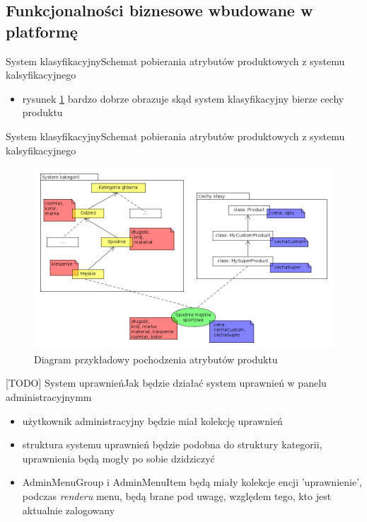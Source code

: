 \documentclass[polish,xcolor=table,9pt,aspectratio=1610,hyperref={pdfpagemode=FullScreen}]{beamer}
\begin{document}
\subsection{Funkcjonalności biznesowe wbudowane w platformę}

\begin{frame}{System klasyfikacyjny}{Schemat pobierania atrybutów produktowych z systemu kalsyfikacyjnego}
\begin{itemize}
	\begin{definition}{Systemu klasyfikacyjny}
		Jest to drzewiasta struktura kategorii połączona z encjami, które mogą przyjmować postać różnych cech produktu, definiować wartości tych cech łączyć je z produktem. Cechy są dzidziczne, zgodnie z ułożeniem drzewa kategorii.
	\end{definition}
	\item<1-> rysunek \ref{cechyProd} bardzo dobrze obrazuje skąd system klasyfikacyjny bierze cechy produktu
\end{itemize}
\end{frame}

\begin{frame}{System klasyfikacyjny}{Schemat pobierania atrybutów produktowych z systemu kalsyfikacyjnego}
	\begin{figure}
		\begin{center}
			\includegraphics[scale=0.3]{cechyProd.png}
		\end{center}
		\caption{{\color{black}Diagram przykładowy pochodzenia atrybutów produktu}} \label{cechyProd}
	\end{figure}
\end{frame}

\begin{frame}{[TODO] System uprawnień}{Jak będzie działać system uprawnień w panelu administracyjnymm}
\begin{itemize}
	\item<1-> użytkownik administracyjny będzie miał kolekcję uprawnień
	\item<2-> struktura systemu uprawnień będzie podobna do struktury kategorii, uprawnienia będą mogły po sobie dzidziczyć
	\item<3-> AdminMenuGroup i AdminMenuItem będą miały kolekcje encji 'uprawnienie', podczas \textit{renderu} menu, będą brane pod uwagę, względem tego, kto jest aktualnie zalogowany
\end{itemize}
\end{frame}
\end{document}
